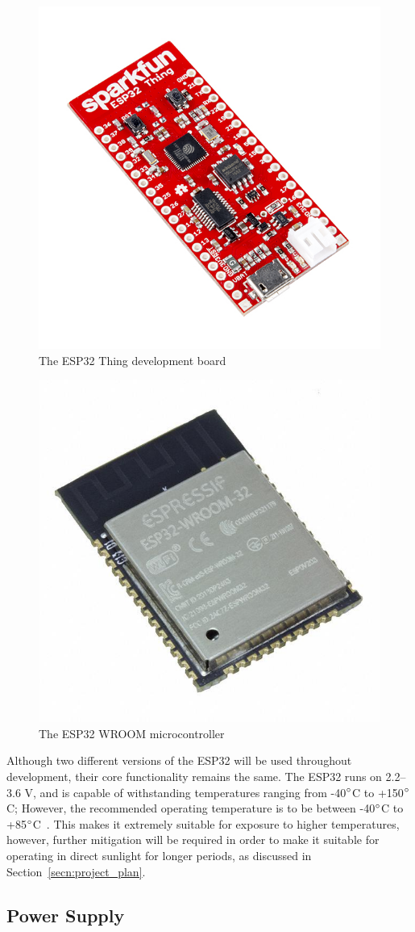 \documentclass[12pt,openany,a4paper]{book}
\newcommand{\secn}[1] {Section~\ref{#1}}	%
\newcommand{\degs}	{\ensuremath{\rm^{\circ}}}
\begin{document}
\begin{figure}[h]
\centerline{\includegraphics[width=.5\textwidth]{ESP32Thing.jpg}}
\caption{The ESP32 Thing development board}
\label{fig:sparkfun_thing}
\end{figure}

\begin{figure}[h]
\centerline{\includegraphics[width=.5\textwidth]{ESP32Wroom.jpg}}
\caption{The ESP32 WROOM microcontroller}
\label{fig:sparkfun_wroom}
\end{figure}

Although two different versions of the ESP32 will be used throughout development,
their core functionality remains the same. The ESP32 runs on 2.2--3.6 V, and is capable of withstanding
temperatures ranging from -40\degs C to +150\degs C; However, the recommended operating
temperature is to be between -40\degs C to +85\degs C~\cite{sparkfun_wroom_datasheet}.
This makes it extremely suitable
for exposure to higher temperatures, however, further mitigation will be required
in order to make it suitable for operating in direct sunlight for longer periods,
as discussed in \secn{secn:project_plan}.

\subsection{Power Supply}
\label{secn:power_supply}
\end{document}
